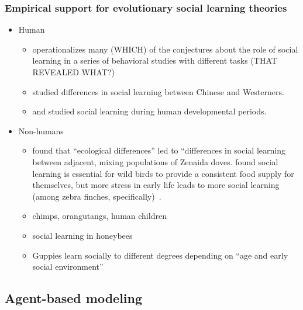 \documentclass[10pt,letterpaper]{article}
\begin{document}
    \subsubsection{Empirical support for evolutionary social learning theories}
    \begin{itemize}
      \item 
        Human
        \begin{itemize}
          \item 
             operationalizes many (WHICH) of the conjectures 
            about the role of social learning in a series of behavioral 
            studies with different tasks (THAT REVEALED WHAT?)
          \item
             studied differences in social learning between
            Chinese and Westerners.
          \item
             and  studied social learning
            during human developmental periods.
        \end{itemize}
      \item
        Non-humans
        \begin{itemize}
          \item 
             found that ``ecological differences'' led to
            ``differences in social learning between adjacent, mixing populations
            of Zenaida doves.  found social learning is essential for
            wild birds to provide a consistent food supply for themselves, but
            more stress in early life leads to more social learning (among
            zebra finches, specifically)~\cite{Farine2015}.
          \item
             chimps, orangutangs, human children
          \item
             social learning in honeybees
          \item
            Guppies learn socially to different degrees depending on 
            ``age and early social environment'' \cite{Leris2016}
        \end{itemize}
    \end{itemize}

    \subsection{Agent-based modeling}
\end{document}
